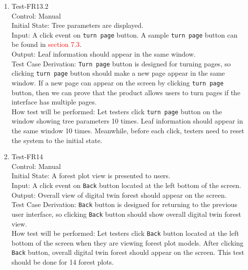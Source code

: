 \documentclass[12pt, titlepage]{article}
\begin{document}
\begin{enumerate}
\item{Test-FR13.2\\}
Control: Manual\\ 

Initial State: Tree parameters are displayed.\\

Input: A click event on \verb|turn page| button. A sample \verb|turn page| button
can be found in \textcolor{red}{section 7.3}.\\

Output: Leaf information should appear in the same window.\\

Test Case Derivation: \verb|Turn page| button is designed for turning pages, so 
clicking \verb|turn page| button should make a new page appear in the same window.
If a new page can appear on the screen by clicking \verb|turn page| button, then we 
can prove that the product allows users to turn pages if the interface has multiple
pages.\\
					
How test will be performed: Let testers click \verb|turn page| button on the 
window showing tree parameters 10 times. Leaf information should appear in the same 
window 10 times. Meanwhile, before each click, testers need to reset the system to 
the initial state.

\item{Test-FR14\\}
Control: Manual\\ 

Initial State: A forest plot view is presented to users.\\

Input: A click event on \verb|Back| button located at the left bottom of the screen.\\

Output: Overall view of digital twin forest should appear on the screen.\\

Test Case Derivation: \verb|Back| button is designed for returning to the 
previous user interface, so clicking \verb|Back| button should show overall digital
twin forest view. \\
					
How test will be performed:  Let testers click \verb|Back| button located at the left 
bottom of the screen when they are viewing forest plot models. After clicking \verb|Back|
button, overall digital twin forest should appear on the screen. 
This test should be done for 14 forest plots.


\end{enumerate}
\end{document}
